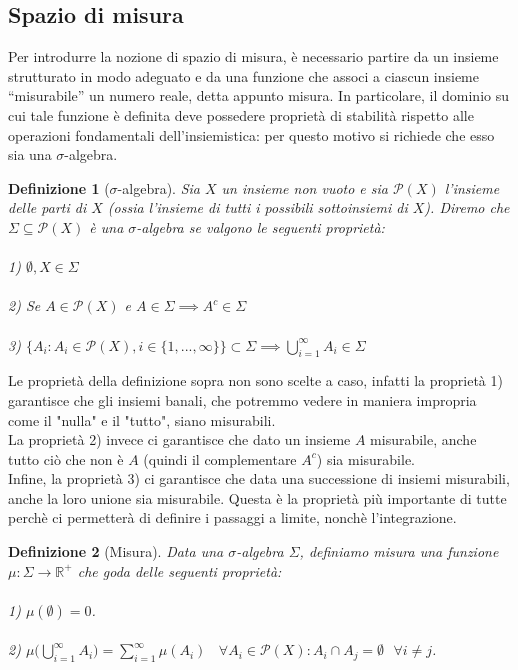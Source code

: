 \documentclass[a4paper,12pt]{report}
\newtheorem{definizione}{Definizione}[chapter]
\begin{document}
\subsection{Spazio di misura}

Per introdurre la nozione di spazio di misura, è necessario partire da un insieme strutturato in modo adeguato e da una funzione che associ a ciascun insieme “misurabile” un numero reale, detta appunto misura. In particolare, il dominio su cui tale funzione è definita deve possedere proprietà di stabilità rispetto alle operazioni fondamentali dell’insiemistica: per questo motivo si richiede che esso sia una $\sigma$-algebra. 

\begin{definizione}[$\sigma$-algebra]\label{def: 3.2}
    Sia $X$ un insieme non vuoto e sia $\mathscr{P}(X)$ l'insieme delle parti di $X$ (ossia l'insieme di tutti i possibili sottoinsiemi di $X$). Diremo che $\Sigma \subseteq\mathscr{P}(X)$ è una $\sigma$-algebra se valgono le seguenti proprietà:
    \\
    \\ 1) $\emptyset, X \in \Sigma$
    \\
    \\ 2) Se $A \in \mathscr{P}( X)$ e $A \in \Sigma \implies A^c \in \Sigma$
    \\
    \\ 3) $\{A_i: A_i \in \mathscr{P}(X), i\in \{1,...,\infty\}\} \subset \Sigma \implies \displaystyle\bigcup_{i=1}^\infty A_i \in \Sigma$
\end{definizione}

Le proprietà della definizione sopra non sono scelte a caso, infatti la proprietà 1) garantisce che gli insiemi banali, che potremmo vedere in maniera impropria come il "nulla" e il "tutto", siano misurabili. 
\\ La proprietà 2) invece ci garantisce che dato un insieme $A$ misurabile, anche tutto ciò che non è $A$ (quindi il complementare $A^c$) sia misurabile.
\\ Infine, la proprietà 3) ci garantisce che data una successione di insiemi misurabili, anche la loro unione sia misurabile. Questa è la proprietà più importante di tutte perchè ci permetterà di definire i passaggi a limite, nonchè l'integrazione.

\begin{definizione}[Misura]\label{def: 3.3}
    Data una $\sigma$-algebra $\Sigma $, definiamo misura una funzione
    \\$\mu: \Sigma \to \mathbb{R}^+$ che goda delle seguenti proprietà:
    \\
    \\ 1) $\mu(\emptyset)=0$.
    \\
    \\ 2) $\mu\bigg(\displaystyle\bigcup_{i=1}^\infty A_i\bigg)=\sum_{i=1}^\infty \mu(A_i) \ \ \ \ \forall A_i \in \mathscr{P}(X): A_i \cap A_j=\emptyset \ \ \ \forall i\neq j $.
\end{definizione}
\end{document}
